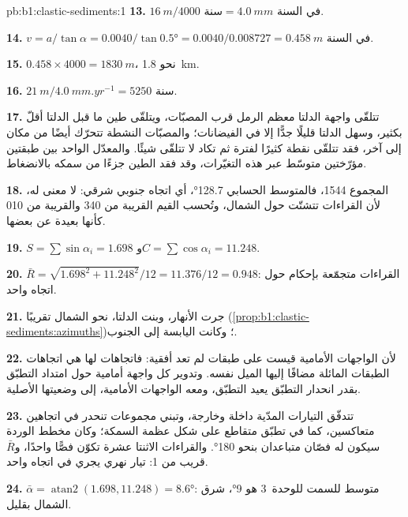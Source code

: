 \begin{solution}{pb:b1:clastic-sediments:1}
\textbf{13.} $\qty{16}{m}/\num{4000}\text{ سنة} = \qty{4.0}{mm}$ في السنة.

\textbf{14.} $v = a/\tan\alpha = 0.0040/\tan\ang{0.5} = 0.0040/0.008727 =
\qty{0.458}{m}$ في السنة.

\textbf{15.} $0.458 \times 4000 = \qty{1830}{m}$، نحو \qty{1.8}{km}.

\textbf{16.} $\qty{21}{m}/\qty{4.0}{mm.yr^{-1}} = 5250$ سنة.

\textbf{17.} تتلقّى واجهة الدلتا معظم الرمل قرب المصبّات، ويتلقّى طين ما قبل الدلتا أقلّ بكثير، وسهل الدلتا قليلًا جدًّا إلا في الفيضانات؛ والمصبّات النشطة تتحرّك أيضًا من مكان إلى آخر، فقد تتلقّى نقطة كثيرًا لفترة ثم تكاد لا تتلقّى شيئًا. والمعدّل الواحد بين طبقتين مؤرّختين متوسّط عبر هذه التغيّرات، وقد فقد الطين جزءًا من سمكه بالانضغاط.

\textbf{18.} المجموع 1544، فالمتوسط الحسابي \ang{128.7}، أي اتجاه جنوبي شرقي: لا معنى له، لأن القراءات تتشتّت حول الشمال، وتُحسب القيم القريبة من 340 والقريبة من 010 كأنها بعيدة عن بعضها.

\textbf{19.} $S = \sum\sin\alpha_i = 1.698$ و$C = \sum\cos\alpha_i =
11.248$.

\textbf{20.} $\bar R = \sqrt{1.698^2 + 11.248^2}/12 = 11.376/12 = 0.948$: القراءات متجمّعة بإحكام حول اتجاه واحد.

\textbf{21.} جرت الأنهار، وبنت الدلتا، نحو الشمال تقريبًا (\cref{prop:b1:clastic-sediments:azimuths})؛ وكانت اليابسة إلى الجنوب.

\textbf{22.} لأن الواجهات الأمامية قيست على طبقات لم تعد أفقية: فاتجاهات  لها هي اتجاهات الطبقات المائلة مضافًا إليها الميل نفسه. وتدوير كل واجهة أمامية حول امتداد التطبّق بقدر انحدار التطبّق يعيد التطبّق، ومعه الواجهات الأمامية، إلى وضعيتها الأصلية.

\textbf{23.} تتدفّق التيارات المدّية داخلة وخارجة، وتبني مجموعات تنحدر في اتجاهين متعاكسين، كما في تطبّق متقاطع على شكل عظمة السمكة؛ وكان مخطط الوردة سيكون له فصّان متباعدان بنحو \ang{180}. والقراءات الاثنتا عشرة تكوّن فصًّا واحدًا، و$\bar R$ قريب من 1: تيار نهري يجري في اتجاه واحد.

\textbf{24.} $\bar\alpha = \operatorname{atan2}(1.698, 11.248) = \ang{8.6}$: متوسط  للسمت للوحدة~3 هو \ang{9}، شرق الشمال بقليل.
\end{solution}
